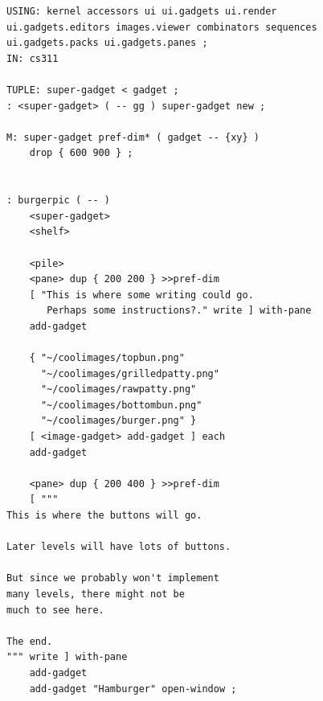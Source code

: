 \documentclass{sig-alternate}
\begin{document}
\begin{verbatim}
USING: kernel accessors ui ui.gadgets ui.render 
ui.gadgets.editors images.viewer combinators sequences
ui.gadgets.packs ui.gadgets.panes ;
IN: cs311

TUPLE: super-gadget < gadget ;
: <super-gadget> ( -- gg ) super-gadget new ;

M: super-gadget pref-dim* ( gadget -- {xy} ) 
    drop { 600 900 } ;


: burgerpic ( -- )
    <super-gadget>
    <shelf>

    <pile>
    <pane> dup { 200 200 } >>pref-dim
    [ "This is where some writing could go.
       Perhaps some instructions?." write ] with-pane
    add-gadget

    { "~/coolimages/topbun.png"
      "~/coolimages/grilledpatty.png"
      "~/coolimages/rawpatty.png"
      "~/coolimages/bottombun.png"
      "~/coolimages/burger.png" }
    [ <image-gadget> add-gadget ] each
    add-gadget

    <pane> dup { 200 400 } >>pref-dim
    [ """
This is where the buttons will go.

Later levels will have lots of buttons.

But since we probably won't implement
many levels, there might not be
much to see here.

The end.
""" write ] with-pane
    add-gadget
    add-gadget "Hamburger" open-window ;
\end{verbatim}
\end{document}
